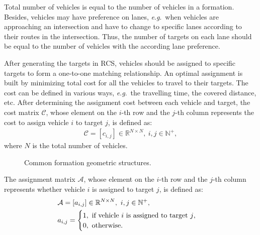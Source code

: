 \documentclass[journal]{IEEEtranTIE}
\newcommand{\eg}{\textit{e}.\textit{g}.}
\begin{document}
Total number of vehicles is equal to the number of vehicles in a formation. Besides, vehicles may have preference on lanes, \eg\, when vehicles are approaching an intersection and have to change to specific lanes according to their routes in the intersection. Thus, the number of targets on each lane should be equal to the number of vehicles with the according lane preference.

After generating the targets in RCS, vehicles should be assigned to specific targets to form a one-to-one matching relationship. An optimal assignment is built by minimizing total cost for all the vehicles to travel to their targets. The cost can be defined in various ways, \eg\, the travelling time, the covered distance, etc. After determining the assignment cost between each vehicle and target, the cost matrix $\mathcal{C}$, whose element on the $i$-th row and the $j$-th column represents the cost to assign vehicle $i$ to target $j$, is defined as:
\begin{eqnarray}
\mathcal{C}=[c_{i,j}]\in \mathbb{R}^{N\times N},\ i,j\in \mathbb{N}^+,
\end{eqnarray}
where $N$ is the total number of vehicles.

\begin{figure}
\begin{center}
    \caption{Common formation geometric structures. }
    \label{structure}
\end{center}
\end{figure}



The assignment matrix $\mathcal{A}$, whose element on the $i$-th row and the $j$-th column represents whether vehicle $i$ is assigned to target $j$, is defined as:
\begin{eqnarray}
&\mathcal{A}=[a_{i,j}]\in \mathbb{R}^{N\times N},\ i,j\in \mathbb{N}^+, \ \\
&a_{i,j}=
\begin{cases}
1, \ \text{if vehicle $i$ is assigned to target $j$},\notag \\
0, \ \text{otherwise}.
\end{cases}
\end{eqnarray}
\end{document}
